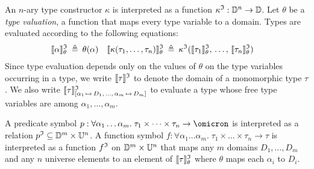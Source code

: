 An $n$-ary type constructor $\kappa$ is interpreted as a function
$\kappa^{\mathfrak{I}} : \mathbb{D}^n \to \mathbb{D}$.
Let $\theta$ be a {\em type valuation}, a function that maps every
type variable to a domain. Types are evaluated according to the following
equations:
\begin{align*}
\llbracket\alpha\rrbracket^{\mathfrak{I}}_{\theta} &\:\triangleq\: \theta(\alpha) &
\llbracket\kappa(\tau_1,\dots,\tau_n)\rrbracket^{\mathfrak{I}}_{\theta} &\:\triangleq\: \kappa^{\mathfrak{I}}(\llbracket\tau_1\rrbracket^{\mathfrak{I}}_{\theta},\,\dots,\,\llbracket\tau_n\rrbracket^{\mathfrak{I}}_{\theta})
\end{align*}
Since type evaluation depends only on the values of $\theta$
on the type variables occurring in a type, we write $\llbracket\tau\rrbracket^{\mathfrak{I}}$
to denote the domain of a monomorphic type $\tau$.
We also write
$\llbracket\tau\rrbracket^{\mathfrak{I}}_{[\alpha_1\,\mapsto\,D_1,\,\dots,\,\alpha_m\,\mapsto\,D_m]}$
to evaluate a type whose free type variables
are among $\alpha_1,\dots,\alpha_m$.

A predicate symbol $p : \forall \alpha_1\dots\alpha_m .\; \tau_1 \times \dots \times \tau_n
\to \omicron$ is interpreted as a relation
$\smash{p^{\mathfrak{I}}} \subseteq \mathbb{D}^m \times \mathbb{U}^n$.
A function symbol $f : \forall \alpha_1\dots\alpha_m .\; \tau_1 \times \dots \times \tau_n \to \tau$
is interpreted as a function
$f^{\mathfrak{I}}$ on $\mathbb{D}^m \times \mathbb{U}^n$ that
maps any $m$ domains $D_1,\dots,D_m$ and
any $n$ universe elements to an element of
$\llbracket\tau\rrbracket^{\mathfrak{I}}_\theta$ where $\theta$ maps each $\alpha_i$ to $D_i$.

